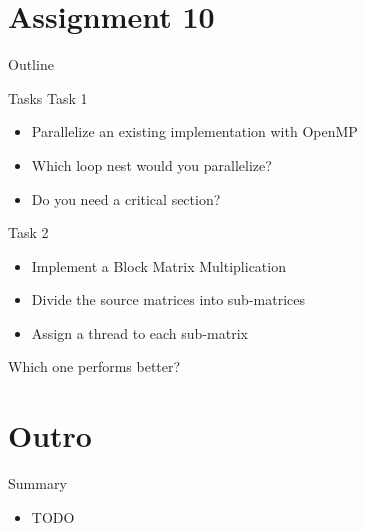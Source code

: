 \section{Assignment 10}

\begin{frame}{Outline}
  \tableofcontents[current]
\end{frame}

\begin{frame}{Tasks}
  Task 1
  \begin{itemize}
  \item Parallelize an existing implementation with OpenMP
  \item Which loop nest would you parallelize?
  \item Do you need a critical section?
  \end{itemize}


  Task 2
  \begin{itemize}
  \item Implement a Block Matrix Multiplication
  \item Divide the source matrices into sub-matrices
  \item Assign a thread to each sub-matrix
  \end{itemize}


  Which one performs better?
\end{frame}


\section*{Outro}

\begin{frame}{Summary}
  \begin{itemize}
  \item TODO
  \end{itemize}
\end{frame}


